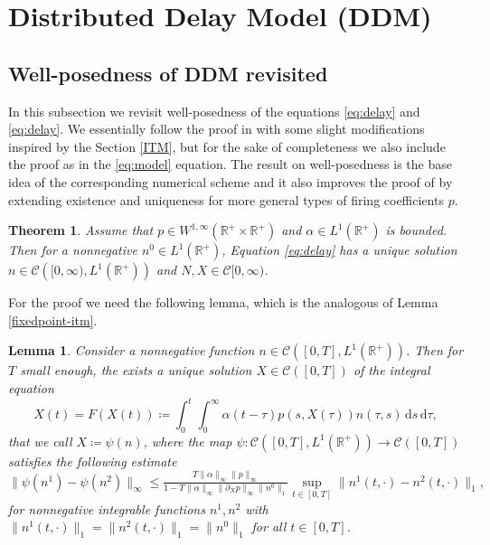 \documentclass[11pt,a4paper]{article}
\newcommand{\R}{\mathbb{R}}
\newcommand{\dd}{\mathrm{d}}
\newtheorem{theorem}{Theorem}[section]
\newtheorem{lemma}{Lemma}[section]
\begin{document}
\section{Distributed Delay Model (DDM)}
\label{DDM}

\subsection{Well-posedness of DDM revisited}
In this subsection we revisit well-posedness of the equations \eqref{eq:delay} and \eqref{eq:delay}. We essentially follow the proof in \cite{chevallier2015mean} with some slight modifications inspired by the Section \ref{ITM}, but for the sake of completeness we also include the proof as in the \eqref{eq:model} equation. The result on well-posedness is the base idea of the corresponding numerical scheme and it also improves the proof of \cite{pakdaman2009dynamics,canizo2019asymptotic} by extending existence and uniqueness for more general types of firing coefficients $p$.

\begin{theorem}
\label{wellp-delay}
      Assume that $p\in W^{1,\infty}(\R^+\times\R^+)$ and $\alpha\in L^1(\R^+)$ is bounded. Then for a nonnegative $n^0\in L^1(\R^+)$,  Equation \eqref{eq:delay} has a unique solution $n\in \mathcal{C}\left([0,\infty),L^1(\R^+)\right)$ and $N,X\in\mathcal{C}[0,\infty)$.
\end{theorem}

For the proof we need the following lemma, which is the analogous of Lemma \ref{fixedpoint-itm}.

\begin{lemma}
\label{fixedpoint-delay}
    Consider a nonnegative function $n\in\mathcal{C}\left([0,T],L^1(\R^+)\right)$. Then for $T$ small enough, the exists a unique solution $X\in\mathcal{C}([0,T])$ of the integral equation
    \begin{equation}
    \label{fixed-X}
       X(t)=F(X(t))\coloneqq \int_0^t\int_0^\infty\alpha(t-\tau)p(s,X(\tau))n(\tau,s)\,\dd s\,\dd \tau, 
    \end{equation}
    that we call $X\coloneqq\psi(n)$, where the map $\psi\colon \mathcal{C}\left([0,T],L^1(\R^+)\right)\to\mathcal{C}([0,T])$ satisfies the following estimate
    \begin{equation}
    \label{psi-lip-d}
        \|\psi(n^1)-\psi(n^2)\|_\infty\le \tfrac{T\|\alpha\|_\infty\|p\|_\infty}{1-T\|\alpha\|_\infty\|\partial_X p\|_\infty\|n^0\|_1}\sup_{t\in[0,T]}\|n^1(t,\cdot)-n^2(t,\cdot)\|_1,
    \end{equation}
    for nonnegative integrable functions $n^1,n^2$ with $\|n^1(t,\cdot)\|_1=\|n^2(t,\cdot)\|_1=\|n^0\|_1$ for all $t\in[0,T]$.
\end{lemma}
\end{document}
